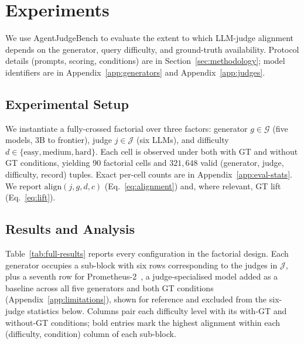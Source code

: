 \vspace{-0.2cm}
\section{Experiments}
\label{sec:experiments}
\vspace{-0.15cm}
We use AgentJudgeBench to evaluate the extent to which LLM-judge alignment depends on the generator, query difficulty, and ground-truth availability. Protocol details (prompts, scoring, conditions) are in Section~\ref{sec:methodology}; model identifiers are in Appendix~\ref{app:generators} and Appendix~\ref{app:judges}.

\subsection{Experimental Setup}
\label{sec:exp:design}
We instantiate a fully-crossed factorial over three factors: generator $g \in \mathcal{G}$ (five models, 3B to frontier), judge $j \in \mathcal{J}$ (six LLMs), and difficulty $d \in \{\text{easy}, \text{medium}, \text{hard}\}$. Each cell is observed under both with GT and without GT conditions, yielding 90 factorial cells and $321{,}648$ valid (generator, judge, difficulty, record) tuples. Exact per-cell counts are in Appendix~\ref{app:eval-stats}. We report $\mathrm{align}(j, g, d, c)$ (Eq.~\ref{eq:alignment}) and, where relevant, GT lift (Eq.~\ref{eq:lift}).

\subsection{Results and Analysis}
\label{sec:exp:main}
Table~\ref{tab:full-results} reports every configuration in the factorial design. Each generator occupies a sub-block with six rows corresponding to the judges in $\mathcal{J}$, plus a seventh row for Prometheus-2~\citep{kim2024prometheus2}, a judge-specialised model added as a baseline across all five generators and both GT conditions (Appendix~\ref{app:limitations}), shown for reference and excluded from the six-judge statistics below. Columns pair each difficulty level with its with-GT and without-GT conditions; bold entries mark the highest alignment within each (difficulty, condition) column of each sub-block.

